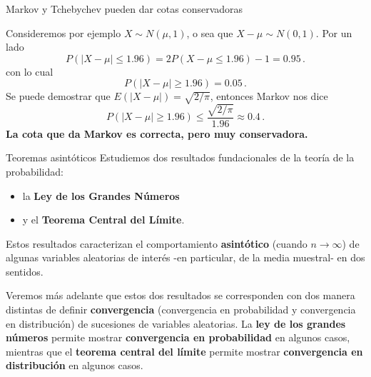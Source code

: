 \documentclass{beamer}
\theoremstyle{definition}
\begin{document}
\begin{frame}{\color{rosee}Markov y Tchebychev pueden dar cotas conservadoras}

 
Consideremos por ejemplo $X\sim N(\mu,1)$, o sea que $X-\mu\sim N(0,1)$. Por un lado
    \[ P(\left\vert X-\mu\right\vert \leq 1.96) = 2 P(X -\mu\leq 1.96) - 1  = 0.95\,. \]
    con lo cual
    \[ P(\left\vert X-\mu\right\vert \geq 1.96) = 0.05\,.\]
    Se puede demostrar que $E(\vert X-\mu \vert)=\sqrt{2/\pi}$,  entonces  Markov nos dice
    \[ P(\left\vert X-\mu\right\vert \geq 1.96)\leq \frac{\sqrt{2/\pi}}{1.96} \approx
    0.4\,.\]
    \textbf{La cota que da Markov es correcta, pero muy conservadora.}
    
  
\end{frame}



\begin{frame}{\color{rosee} Teoremas asintóticos}\small
  Estudiemos dos resultados fundacionales de la teor\'ia de la
  probabilidad: 
  \begin{itemize}
  \item la \textbf{Ley de los Grandes N\'umeros} 
  \item y el \textbf{Teorema Central del L\'imite}.
  \end{itemize}

  \bigskip Estos resultados caracterizan el comportamiento
  \textbf{asint\'otico} (cuando $n \rightarrow \infty$) de algunas variables aleatorias de interés -en particular, de la media muestral- en dos sentidos.

  \medskip Veremos m\'as adelante que estos dos resultados se corresponden con dos manera distintas de definir \textbf{convergencia} (convergencia en probabilidad y convergencia en distribución) de sucesiones de variables aleatorias.
  \medskip
   La \color{-red!70!}\textbf{ley de los grandes números} \color{black} permite mostrar \color{-red!70!}\textbf{convergencia en probabilidad} \color{black} en algunos casos, mientras que el \color{rosee}\textbf{teorema central del límite} \color{black}permite mostrar \color{rosee}\textbf{convergencia en distribución} \color{black}en algunos casos.
\end{frame}
\end{document}
